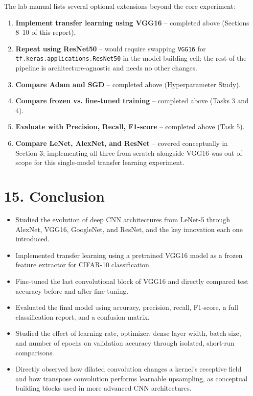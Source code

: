 \documentclass[11pt]{article}
\begin{document}
The lab manual lists several optional extensions beyond the core experiment:

\begin{enumerate}[leftmargin=*]
\item \textbf{Implement transfer learning using VGG16} -- completed above (Sections 8--10 of this report).
\item \textbf{Repeat using ResNet50} -- would require swapping \texttt{VGG16} for \texttt{tf.keras.applications.ResNet50} in the model-building cell; the rest of the pipeline is architecture-agnostic and needs no other changes.
\item \textbf{Compare Adam and SGD} -- completed above (Hyperparameter Study).
\item \textbf{Compare frozen vs. fine-tuned training} -- completed above (Tasks 3 and 4).
\item \textbf{Evaluate with Precision, Recall, F1-score} -- completed above (Task 5).
\item \textbf{Compare LeNet, AlexNet, and ResNet} -- covered conceptually in Section 3; implementing all three from scratch alongside VGG16 was out of scope for this single-model transfer learning experiment.
\end{enumerate}


\section*{15. Conclusion}

\begin{itemize}[leftmargin=*]
\item Studied the evolution of deep CNN architectures from LeNet-5 through AlexNet, VGG16, GoogleNet, and ResNet, and the key innovation each one introduced.
\item Implemented transfer learning using a pretrained VGG16 model as a frozen feature extractor for CIFAR-10 classification.
\item Fine-tuned the last convolutional block of VGG16 and directly compared test accuracy before and after fine-tuning.
\item Evaluated the final model using accuracy, precision, recall, F1-score, a full classification report, and a confusion matrix.
\item Studied the effect of learning rate, optimizer, dense layer width, batch size, and number of epochs on validation accuracy through isolated, short-run comparisons.
\item Directly observed how dilated convolution changes a kernel's receptive field and how transpose convolution performs learnable upsampling, as conceptual building blocks used in more advanced CNN architectures.
\end{itemize}
\end{document}

